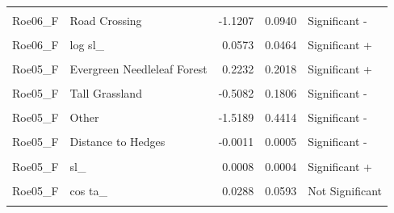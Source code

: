 \documentclass[10pt,a4paper]{article}
\begin{document}
\begin{longtable}[t]{llrrl}
\cellcolor{gray!10}{Roe06\_F} & \cellcolor{gray!10}{Distance to Hedges} & \cellcolor{gray!10}{0.0003} & \cellcolor{gray!10}{0.0003} & \cellcolor{gray!10}{Significant +}\\
Roe06\_F & Road Crossing & -1.1207 & 0.0940 & Significant -\\
\addlinespace
\cellcolor{gray!10}{Roe06\_F} & \cellcolor{gray!10}{sl\_} & \cellcolor{gray!10}{0.0020} & \cellcolor{gray!10}{0.0004} & \cellcolor{gray!10}{Significant +}\\
Roe06\_F & log sl\_ & 0.0573 & 0.0464 & Significant +\\
\cellcolor{gray!10}{Roe06\_F} & \cellcolor{gray!10}{cos ta\_} & \cellcolor{gray!10}{-0.4989} & \cellcolor{gray!10}{0.0358} & \cellcolor{gray!10}{Significant -}\\
Roe05\_F & Evergreen Needleleaf Forest & 0.2232 & 0.2018 & Significant +\\
\cellcolor{gray!10}{Roe05\_F} & \cellcolor{gray!10}{Cropland} & \cellcolor{gray!10}{-13.0823} & \cellcolor{gray!10}{1476.0604} & \cellcolor{gray!10}{Not Significant}\\
\addlinespace
Roe05\_F & Tall Grassland & -0.5082 & 0.1806 & Significant -\\
\cellcolor{gray!10}{Roe05\_F} & \cellcolor{gray!10}{Open Shrubland} & \cellcolor{gray!10}{0.4109} & \cellcolor{gray!10}{0.1951} & \cellcolor{gray!10}{Significant +}\\
Roe05\_F & Other & -1.5189 & 0.4414 & Significant -\\
\cellcolor{gray!10}{Roe05\_F} & \cellcolor{gray!10}{Distance to Woodland} & \cellcolor{gray!10}{-0.0092} & \cellcolor{gray!10}{0.0017} & \cellcolor{gray!10}{Significant -}\\
Roe05\_F & Distance to Hedges & -0.0011 & 0.0005 & Significant -\\
\addlinespace
\cellcolor{gray!10}{Roe05\_F} & \cellcolor{gray!10}{Road Crossing} & \cellcolor{gray!10}{-0.4745} & \cellcolor{gray!10}{0.2430} & \cellcolor{gray!10}{Significant -}\\
Roe05\_F & sl\_ & 0.0008 & 0.0004 & Significant +\\
\cellcolor{gray!10}{Roe05\_F} & \cellcolor{gray!10}{log sl\_} & \cellcolor{gray!10}{0.0486} & \cellcolor{gray!10}{0.0579} & \cellcolor{gray!10}{Not Significant}\\
Roe05\_F & cos ta\_ & 0.0288 & 0.0593 & Not Significant\\
\cellcolor{gray!10}{Roe04\_F} & \cellcolor{gray!10}{Evergreen Needleleaf Forest} & \cellcolor{gray!10}{0.0639} & \cellcolor{gray!10}{0.0979} & \cellcolor{gray!10}{Not Significant}\\

\end{longtable}
\end{document}
